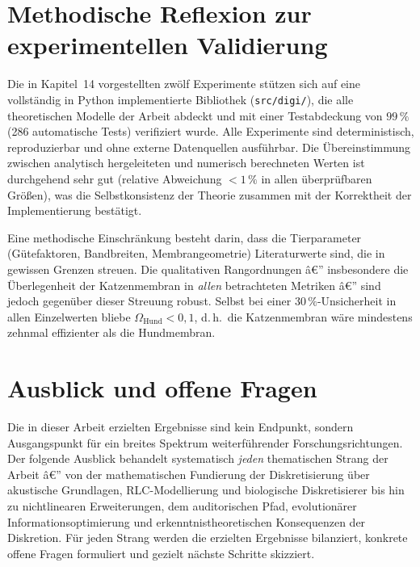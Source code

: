 ﻿\documentclass[12pt,a4paper,titlepage]{report}
\begin{document}
\section{Methodische Reflexion zur experimentellen Validierung}

Die in Kapitel~14 vorgestellten zwölf Experimente stützen sich auf eine
vollständig in Python implementierte Bibliothek (\texttt{src/digi/}),
die alle theoretischen Modelle der Arbeit abdeckt und mit einer
Testabdeckung von $99\,\%$ (286 automatische Tests) verifiziert wurde.
Alle Experimente sind deterministisch, reproduzierbar und ohne externe
Datenquellen ausführbar.
Die Übereinstimmung zwischen analytisch hergeleiteten und numerisch
berechneten Werten ist durchgehend sehr gut (relative Abweichung $<1\,\%$
in allen überprüfbaren Größen), was die Selbstkonsistenz der Theorie
zusammen mit der Korrektheit der Implementierung bestätigt.

Eine methodische Einschränkung besteht darin, dass die Tierparameter
(Gütefaktoren, Bandbreiten, Membrangeometrie) Literaturwerte sind,
die in gewissen Grenzen streuen.
Die qualitativen Rangordnungen â€” insbesondere die Überlegenheit der
Katzenmembran in \emph{allen} betrachteten Metriken â€” sind jedoch
gegenüber dieser Streuung robust.
Selbst bei einer $30\,\%$-Unsicherheit in allen Einzelwerten bliebe
$\Omega_{\mathrm{Hund}} < 0{,}1$, d.\,h.\ die Katzenmembran wäre
mindestens zehnmal effizienter als die Hundmembran.

\section{Ausblick und offene Fragen}

Die in dieser Arbeit erzielten Ergebnisse sind kein Endpunkt, sondern
Ausgangspunkt für ein breites Spektrum weiterführender Forschungsrichtungen.
Der folgende Ausblick behandelt systematisch \emph{jeden} thematischen Strang
der Arbeit â€” von der mathematischen Fundierung der Diskretisierung über
akustische Grundlagen, RLC-Modellierung und biolo\-gische Diskretisierer
bis hin zu nichtlinearen Erweiterungen, dem auditorischen Pfad,
evolution\-ärer Informationsoptimierung und erkenntnistheoretischen Konsequenzen
der Diskretion. Für jeden Strang werden die erzielten Ergebnisse bilanziert,
konkrete offene Fragen formuliert und gezielt nächste Schritte skizziert.

\end{document}
